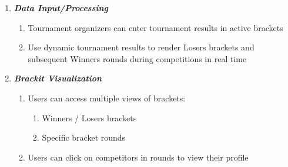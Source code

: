 \documentclass{article}
\begin{document}
\begin{enumerate}
    \item \textbf{\textit{Data Input/Processing}}
        \begin{enumerate}[label*=\arabic*.]
            \item{Tournament organizers can enter tournament results in active brackets}
            \item{Use dynamic tournament results to render Losers brackets and subsequent Winners rounds during competitions in real time}

        \end{enumerate}

    \item \textbf{\textit{Brackit Visualization}}
        \begin{enumerate}[label*=\arabic*.]
            \item{Users can access multiple views of brackets:} \label{4.1}
            \begin{enumerate}[label*=\arabic*.]
                \item{Winners / Losers brackets}
                \item{Specific bracket rounds}
            \end{enumerate}
            \item{Users can click on competitors in rounds to view their profile}
        \end{enumerate}
    
\end{enumerate}
\end{document}
